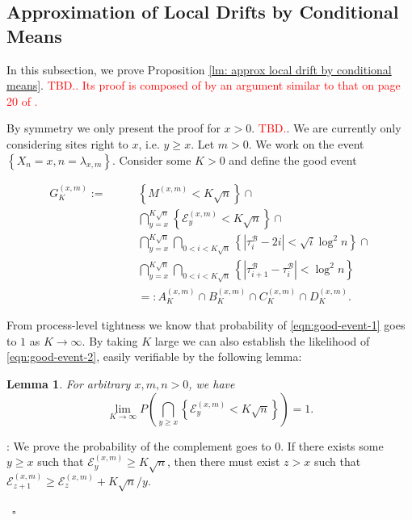 \documentclass[twoside,12pt,a4paper]{article}
\newtheorem{lemma}{Lemma}[section]
\numberwithin{equation}{section}
\newenvironment{proof}{{\sc Proof}:}{~\hfill $\square$}
\newcommand\TBD{\textcolor{red}{TBD.}}
\begin{document}
{\subsection{Approximation of Local Drifts by Conditional Means}
In this subsection, we prove Proposition \ref{lm: approx local drift by conditional means}. \textcolor{red}{\TBD. Its proof is composed of by an argument similar to that on page 20 of \cite{KP16}.}

By symmetry we only present the proof for $x >  0$. \TBD. We are currently only considering sites right to $x$, i.e. $y \ge x$. Let $m > 0$.
We work on the event $\left\{ X_n = x, n = \lambda_{x, m} \right\} $. Consider some $K>0$ and define the good event

\begin{align}
	G_K^{(x,m)} :=  \qquad
		\label{eqn:good-event-1}
		& \left\{ M^{(x,m)}< K \sqrt{n}\right\} \cap  \\ 
		\label{eqn:good-event-2}
		& \bigcap_{y = x}^{K \sqrt{n}}  \left\{\mathcal{E}_y^{(x,m)} < K \sqrt{ n} \right\}  \cap \\
		\label{eqn:good-event-3}
		& \bigcap_{y = x}^{K \sqrt{n}} \bigcap_{0<i<K\sqrt{n}} \left\{\left| \tau_i^{\mathcal{B}} - 2 i \right| < \sqrt{ i } \log^2 n \right\}  \cap \\
		\label{eqn:good-event-4}
		& \bigcap_{y = x}^{K \sqrt{n}} \bigcap_{0<i<K\sqrt{n}} \left\{\left| \tau_{i+1}^{\mathcal{B}} - \tau_i^{\mathcal{B}} \right| < \log^2 n \right\}  \\
		&=: A_K^{(x,m)} \cap B_{K}^{(x,m)} 
		\cap C_{K}^{(x,m)}
		\cap D_{K}^{(x,m)} 
.\end{align}

From process-level tightness we know that probability of \eqref{eqn:good-event-1} goes to $1$ as $K \to \infty $. By taking $K$ large we can also establish the likelihood of \eqref{eqn:good-event-2}, easily verifiable by the following lemma:

\begin{lemma}
	For arbitrary $x, m, n>0$, we have
	\[
		\lim_{K \to \infty} 
		P\left( \bigcap_{y \ge x} \left\{\mathcal{E}_y^{(x,m)} < K \sqrt{ n} \right\} \right) = 1
	.\] 
\end{lemma}
\begin{proof}
	We prove the probability of the complement goes to $0$. If there exists some $y \ge x$ such that $\mathcal{E}_y^{(x,m)} \ge  K \sqrt{n} $, then there must exist $z>x$ such that $\mathcal{E}_{z+1}^{(x,m)} \ge \mathcal{E}_{z}^{(x,m)} + K \sqrt{n} / y $.


\end{proof}}
\end{document}
